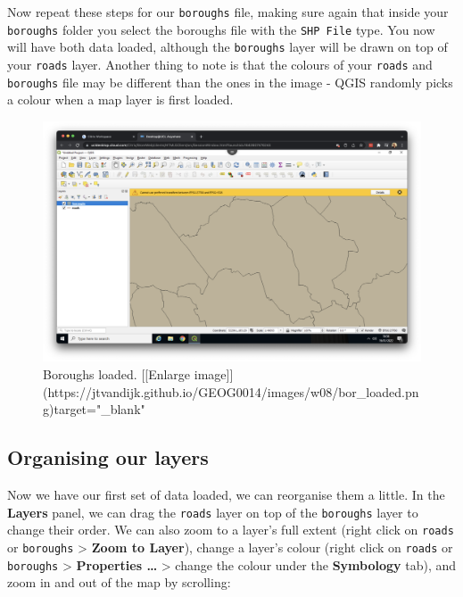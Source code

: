 \documentclass[
]{book}
\begin{document}
Now repeat these steps for our \texttt{boroughs} file, making sure again that inside your \texttt{boroughs} folder you select the boroughs file with the \texttt{SHP\ File} type. You now will have both data loaded, although the \texttt{boroughs} layer will be drawn on top of your \texttt{roads} layer. Another thing to note is that the colours of your \texttt{roads} and \texttt{boroughs} file may be different than the ones in the image - QGIS randomly picks a colour when a map layer is first loaded.

\begin{figure}

{\centering \includegraphics[width=850pt]{images/w08/bor_loaded} 

}

\caption{Boroughs loaded. [[Enlarge image]](https://jtvandijk.github.io/GEOG0014/images/w08/bor_loaded.png){target="_blank"}}\label{fig:bor-loaded}
\end{figure}

\hypertarget{organising-our-layers}{%
\subsection*{Organising our layers}\label{organising-our-layers}}

Now we have our first set of data loaded, we can reorganise them a little. In the \textbf{Layers} panel, we can drag the \texttt{roads} layer on top of the \texttt{boroughs} layer to change their order. We can also zoom to a layer's full extent (right click on \texttt{roads} or \texttt{boroughs} \textgreater{} \textbf{Zoom to Layer}), change a layer's colour (right click on \texttt{roads} or \texttt{boroughs} \textgreater{} \textbf{Properties \ldots{}} \textgreater{} change the colour under the \textbf{Symbology} tab), and zoom in and out of the map by scrolling:
\end{document}
